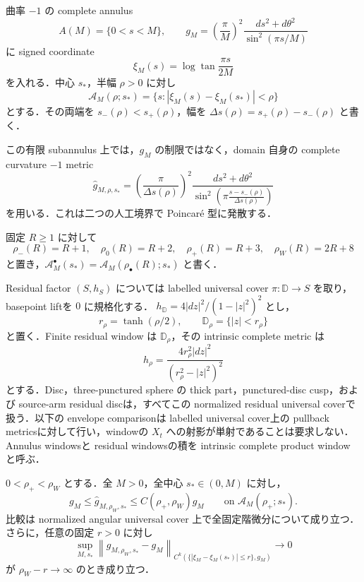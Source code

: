 \documentclass[a4paper,11pt]{ltjsarticle}
\numberwithin{equation}{section}
\theoremstyle{plain}
\theoremstyle{definition}
\theoremstyle{remark}
\begin{document}
\begin{definition}\label{coarse:def:adapted-windows}
曲率 $-1$ の complete annulus
\[
 A(M)=\{0<s<M\},\qquad
 g_M=\left(\frac{\pi}{M}\right)^2
 \frac{ds^2+d\theta^2}{\sin^2(\pi s/M)}
\]
に signed coordinate
\[
 \xi_M(s)=\log\tan\frac{\pi s}{2M}
\]
を入れる．中心 $s_*$，半幅 $\rho>0$ に対し
\[
 \mathcal A_M(\rho;s_*)
 =\{s:|\xi_M(s)-\xi_M(s_*)|<\rho\}
\]
とする．その両端を $s_-(\rho)<s_+(\rho)$，幅を
$\Delta s(\rho)=s_+(\rho)-s_-(\rho)$ と書く．

この有限 subannulus 上では，$g_M$ の制限ではなく，domain 自身の complete curvature $-1$ metric
\begin{equation}\label{coarse:eq:intrinsic-window-metric}
 \widehat g_{M,\rho,s_*}
 =\left(\frac{\pi}{\Delta s(\rho)}\right)^2
 \frac{ds^2+d\theta^2}
 {\sin^2\!\left(\pi\frac{s-s_-(\rho)}{\Delta s(\rho)}\right)}
\end{equation}
を用いる．これは二つの人工境界で Poincar\'e 型に発散する．

固定 $R\ge1$ に対して
\[
 \rho_-(R)=R+1,\quad
 \rho_0(R)=R+2,\quad
 \rho_+(R)=R+3,\quad
 \rho_W(R)=2R+8
\]
と置き，$\mathcal A_M^\bullet(s_*)=\mathcal A_M(\rho_\bullet(R);s_*)$ と書く．

Residual factor $(S,h_S)$ については labelled universal cover
$\pi:\mathbb D\to S$ を取り，basepoint liftを $0$ に規格化する．
$h_{\mathbb D}=4|dz|^2/(1-|z|^2)^2$ とし，
\[
 r_\rho=\tanh(\rho/2),\qquad
 \mathbb D_\rho=\{|z|<r_\rho\}
\]
と置く．Finite residual window は $\mathbb D_\rho$，その intrinsic complete metric は
\begin{equation}\label{coarse:eq:intrinsic-residual-window-metric}
 \widehat h_\rho
 =\frac{4r_\rho^2|dz|^2}{(r_\rho^2-|z|^2)^2}
\end{equation}
とする．Disc，three-punctured sphere の thick part，punctured-disc cusp，および source-arm residual discは，すべてこの normalized residual universal coverで扱う．以下の envelope comparisonは labelled universal cover上の pullback metricsに対して行い，windowの $X_t$ への射影が単射であることは要求しない．Annulus windowsと residual windowsの積を intrinsic complete product window と呼ぶ．
\end{definition}

\begin{lemma}\label{coarse:lem:intrinsic-annulus-window}
$0<\rho_+<\rho_W$ とする．全 $M>0$，全中心 $s_*\in(0,M)$ に対し，
\begin{equation}\label{coarse:eq:annulus-window-comparison}
 g_M\le \widehat g_{M,\rho_W,s_*}
 \le C(\rho_+,\rho_W)g_M
 \qquad\text{on }\mathcal A_M(\rho_+;s_*).
\end{equation}
比較は normalized angular universal cover 上で全固定階微分について成り立つ．さらに，任意の固定 $r>0$ に対し
\begin{equation}\label{coarse:eq:annulus-window-exhaustion}
 \sup_{M,s_*}
 \left\|
 \widehat g_{M,\rho_W,s_*}-g_M
 \right\|_{C^k(\{|\xi_M-\xi_M(s_*)|\le r\},g_M)}
 \longrightarrow0
\end{equation}
が $\rho_W-r\to\infty$ のとき成り立つ．
\end{lemma}
\end{document}
